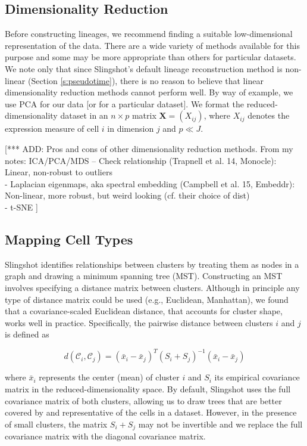 \documentclass[11pt]{article}\usepackage[]{graphicx}\usepackage[]{color}
\begin{document}
\subsection{Dimensionality Reduction}
\label{s:dimRed}
Before constructing lineages, we recommend finding a suitable low-dimensional representation of the data. There are a wide variety of methods available for this purpose and some may be more appropriate than others for particular datasets. We note only that since Slingshot's default lineage reconstruction method is non-linear (Section \ref{s:pseudotime}), there is no reason to believe that linear dimensionality reduction methods cannot perform well. By way of example, we use PCA for our data [or for a particular dataset]. We format the reduced-dimensionality dataset in an $n \times p$ matrix $\mathbf{X} = (X_{ij})$, where $X_{ij}$ denotes the expression measure of cell $i$ in dimension $j$ and $p \ll J$.

[*** ADD: Pros and cons of other dimensionality reduction methods. 
    From my notes: ICA/PCA/MDS -- Check relationship (Trapnell et al. 14, Monocle): Linear, non-robust to outliers\\
- Laplacian eigenmaps, aka spectral embedding (Campbell et al. 15, Embeddr): Non-linear, more robust, but weird looking (cf. their choice of dist)\\
- t-SNE 
]


\subsection{Mapping Cell Types}
\label{s:MST}
Slingshot identifies relationships between clusters by treating them as nodes in a graph and drawing a minimum spanning tree (MST). Constructing an MST involves specifying a distance matrix between clusters. Although in principle any type of distance matrix could be used (e.g., Euclidean, Manhattan), we found that a covariance-scaled Euclidean distance, that accounts for cluster shape, works well in practice. Specifically, the pairwise distance between clusters $i$ and $j$ is defined as

$$d(\mathcal{C}_i,\mathcal{C}_j) = (\bar{x}_i - \bar{x}_j)^T (S_i + S_j)^{-1} (\bar{x}_i - \bar{x}_j)$$

where $\bar{x}_i$ represents the center (mean) of cluster $i$ and $S_i$ its empirical covariance matrix in the reduced-dimensionality space.
By default, Slingshot uses the full covariance matrix of both clusters, allowing us to draw trees that are better covered by and representative of the cells in a dataset.  However, in the presence of small clusters, the matrix $S_i + S_j$ may not be invertible and we replace the full covariance matrix with the diagonal covariance matrix.
\end{document}
